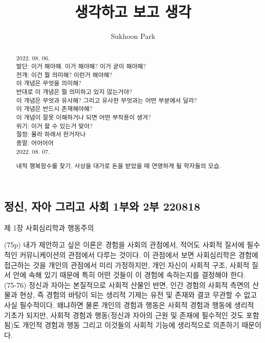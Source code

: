 \documentclass[11pt, a4paper]{article}
\begin{document}
\title{생각하고 보고 생각}
\author{Sukhoon Park}
\maketitle

\begin{abstract}

2022. 08. 06. \\
발단: 이거 해야해. 이거 해야해? 이거 굳이 해야해? \\
전개: 이건 뭘 의미해? 이런거 해야해? \\
이 개념은 무엇을 의미해? \\
반대로 이 개념은 뭘 의미하고 있지 않는거야? \\
이 개념은 무엇과 유사해? 그리고 유사한 무엇과는 어떤 부분에서 달라? \\
이 개념은 반드시 존재해야해? \\
이 개념이 잘못 이해하거나 되면 어떤 부작용이 생겨? \\
위기: 이거 할 수 있는거 맞아? \\
절정: 몰라 하래서 한거자나 \\
종말: 어어어어 \\

2022. 08. 07.

내적 행복함수를 찾기. 사상을 대가로 돈을 받았을 때 연명하게 될 학자들의 모습. \\


\end{abstract}

\newpage
\subsection{정신, 자아 그리고 사회 1부와 2부 220818}

제 1장 사회심리학과 행동주의

(75p) 내가 제안하고 싶은 이론은 경험을 사회의 관점에서, 적어도 사회적 질서에 필수적인 커뮤니케이션의 관점에서 다루는 것이다. 이 관점에서 보면 사회심리학은 경험에 접근하는 것을 개인의 관점에서 미리 가정하지만, 개인 자신이 사회적 구조, 사회적 질서 안에 속해 있기 때문에 특히 어떤 것들이 이 경험에 속하는지를 결정해야 한다. \\

(75-76) 정신과 자아는 본질적으로 사회적 산물인 반면, 인간 경험의 사회적 측면의 산물과 현상, 즉 경험의 바탕이 되는 생리적 기제는 유전 및 존재와 결코 무관할 수 없고 사실 필수적이다. 왜냐하면 물론 개인의 경험과 행동은 사회적 경험과 행동에 생리적 기초가 되지만, 사회적 경험과 행동(정신과 자아의 근원 및 존재에 필수적인 것도 포함됨)도 개인적 경험과 행동 그리고 이것들의 사회적 기능에 생리적으로 의존하기 때문이다. 
\end{document}
